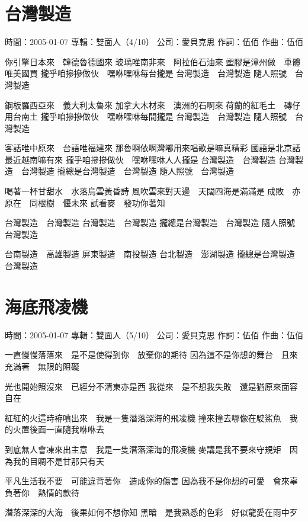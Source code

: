 \documentclass[UTF8,a4paper,oneside,twocolumn,12pt]{ctexbook}
\newcommand{\infopair}[2]{\textbullet #1：#2}
\newcommand{\zc}[1][伍佰]{\infopair{作詞}{#1}}
\newcommand{\zq}[1][伍佰]{\infopair{作曲}{#1}}
\newcommand{\zj}[1]{\infopair{專輯}{#1}}
\newcommand{\sj}[1]{\infopair{時間}{#1}}
\newcommand{\gs}[1]{\infopair{公司}{#1}}
\newenvironment{info}{\begin{flushleft}\kaishu
	}
	{\end{flushleft}\normalsize\yahei\par}
\newenvironment{lyric}{
	}
{}
\begin{document}
\section{台灣製造}
\begin{info}
	\sj{2005-01-07}
	\zj{雙面人（4/10）}
	\gs{愛貝克思}
	\zc
	\zq
\end{info}
\begin{lyric}
	你引擎日本來　韓德魯德國來
	玻璃唯南非來　阿拉伯石油來
	塑膠是漳州做　車體唯美國買
	攏乎咱摻摻做伙　嘿咻嘿咻每台攏是
	台灣製造　台灣製造
	隨人照號　台灣製造

	鋼板羅西亞來　義大利太魯來
	加拿大木材來　澳洲的石啊來
	荷蘭的紅毛土　磚仔用台南土
	攏乎咱摻摻做伙　嘿咻嘿咻每間攏是
	台灣製造　台灣製造
	隨人照號　台灣製造

	客話唯中原來　台語唯福建來
	那魯啊依啊灣嘟用來唱歌是嘛真精彩
	國語是北京話　最近越南嘛有來
	攏乎咱摻摻做伙　嘿咻嘿咻人人攏是
	台灣製造　台灣製造
	台灣製造　台灣製造
	攏總是台灣製造　台灣製造
	隨人照號　台灣製造

	喝著一杯甘甜水　水落烏雲黃昏詩
	風吹雲來對天邊　天闊四海是滿滿是
	成敗　亦原在　同根樹　偃未來
	試看麥　發功你著知

	台灣製造　台灣製造
	台灣製造　台灣製造
	攏總是台灣製造　台灣製造
	隨人照號　台灣製造

	台南製造　高雄製造
	屏東製造　南投製造
	台北製造　澎湖製造
	攏總是台灣製造　台灣製造
\end{lyric}

\section{海底飛凌機}
\begin{info}
	\sj{2005-01-07}
	\zj{雙面人（5/10）}
	\gs{愛貝克思}
	\zc
	\zq
\end{info}
\begin{lyric}
	一直慢慢落落來　是不是使得到你　放棄你的期待
	因為這不是你想的舞台　且來充滿著　無限的阻礙

	光也開始照沒來　已經分不清東亦是西
	我從來　是不想我失敗　還是猶原來面容自在

	紅紅的火這時袸噴出來　我是一隻潛落深海的飛凌機
	撞來撞去哪像在駛鯊魚　我的火置後面一直隨我咻咻去

	到底無人會凍來出主意　我是一隻潛落深海的飛凌機
	麥講是我不要來守規矩　因為我的目睭不是甘那只有天

	平凡生活我不要　可能違背著你　造成你的傷害
	因為我不是你想的可愛　會來辜負著你　熱情的款待

	潛落深深的大海　後果如何不想你知
	黑暗　是我熟悉的色彩　好似龍愛在雨中歹
\end{lyric}
\end{document}
